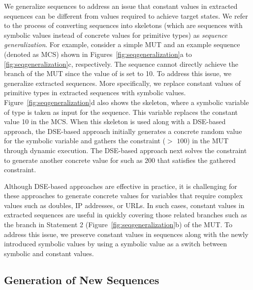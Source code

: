 We generalize sequences to address an issue that constant values in extracted sequences can be different from values required to achieve target states. We refer to the process of converting sequences into skeletons (which are sequences with symbolic values instead of concrete values for primitive types) as \emph{sequence generalization}. For example, consider a simple MUT and an example sequence (denoted as MCS) shown in Figures~\ref{fig:seqgeneralization}a to \ref{fig:seqgeneralization}c, respectively. The sequence cannot directly achieve the  branch of the MUT since the value of  is set to 10. To address this issue, we generalize extracted sequences. More specifically, we replace constant values of primitive types in extracted sequences with symbolic values. Figure~\ref{fig:seqgeneralization}d also shows the skeleton, where a symbolic variable  of type  is taken as input for the sequence. This  variable replaces the constant value 10 in the MCS. When this skeleton is used along with a DSE-based approach, the DSE-based approach initially generates a concrete random value for the  symbolic variable and gathers the constraint ($>$ $100$) in the MUT through dynamic execution. The DSE-based approach next solves the constraint to generate another concrete value for  such as $200$ that satisfies the gathered constraint. 

Although DSE-based approaches are effective in practice, it is challenging for these approaches to generate concrete values for variables that require complex values such as doubles, IP addresses, or URLs. In such cases, constant values in extracted sequences are useful in quickly covering those related branches such as the  branch in Statement 2 (Figure~\ref{fig:seqgeneralization}b) of the MUT. To address this issue, we preserve constant values in sequences along with the newly introduced symbolic values by using a symbolic  value as a switch between symbolic and constant values.
\subsection{Generation of New Sequences}

